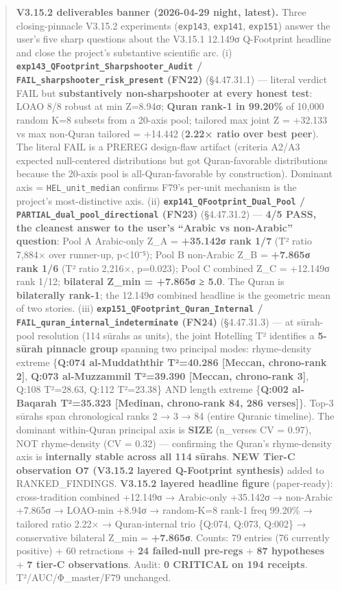 \documentclass[
]{article}
\begin{document}
\begin{quote}
\textbf{V3.15.2 deliverables banner (2026-04-29 night, latest).} Three
closing-pinnacle V3.15.2 experiments (\texttt{exp143}, \texttt{exp141},
\texttt{exp151}) answer the user's five sharp questions about the
V3.15.1 12.149σ Q-Footprint headline and close the project's substantive
scientific arc. (i)
\textbf{\texttt{exp143\_QFootprint\_Sharpshooter\_Audit} /
\texttt{FAIL\_sharpshooter\_risk\_present} (FN22)} (§4.47.31.1) ---
literal verdict FAIL but \textbf{substantively non-sharpshooter at every
honest test}: LOAO 8/8 robust at min Z=8.94σ; \textbf{Quran rank-1 in
99.20\%} of 10,000 random K=8 subsets from a 20-axis pool; tailored max
joint Z = +32.133 vs max non-Quran tailored = +14.442 (\textbf{2.22×
ratio over best peer}). The literal FAIL is a PREREG design-flaw
artifact (criteria A2/A3 expected null-centered distributions but got
Quran-favorable distributions because the 20-axis pool is
all-Quran-favorable by construction). Dominant axis =
\texttt{HEL\_unit\_median} confirms F79's per-unit mechanism is the
project's most-distinctive axis. (ii)
\textbf{\texttt{exp141\_QFootprint\_Dual\_Pool} /
\texttt{PARTIAL\_dual\_pool\_directional} (FN23)} (§4.47.31.2) ---
\textbf{4/5 PASS, the cleanest answer to the user's ``Arabic vs
non-Arabic'' question}: Pool A Arabic-only Z\_A = \textbf{+35.142σ rank
1/7} (T² ratio 7,884× over runner-up, p\textless10⁻⁵); Pool B non-Arabic
Z\_B = \textbf{+7.865σ rank 1/6} (T² ratio 2,216×, p=0.023); Pool C
combined Z\_C = +12.149σ rank 1/12; \textbf{bilateral Z\_min = +7.865σ ≥
5.0}. The Quran is \textbf{bilaterally rank-1}; the 12.149σ combined
headline is the geometric mean of two stories. (iii)
\textbf{\texttt{exp151\_QFootprint\_Quran\_Internal} /
\texttt{FAIL\_quran\_internal\_indeterminate} (FN24)} (§4.47.31.3) ---
at sūrah-pool resolution (114 sūrahs as units), the joint Hotelling T²
identifies a \textbf{5-sūrah pinnacle group} spanning two principal
modes: rhyme-density extreme \{\textbf{Q:074 al-Muddaththir T²=40.286
{[}Meccan, chrono-rank 2{]}}, \textbf{Q:073 al-Muzzammil T²=39.390
{[}Meccan, chrono-rank 3{]}}, Q:108 T²=28.63, Q:112 T²=23.38\} AND
length extreme \{\textbf{Q:002 al-Baqarah T²=35.323 {[}Medinan,
chrono-rank 84, 286 verses{]}}\}. Top-3 sūrahs span chronological ranks
2 → 3 → 84 (entire Quranic timeline). The dominant within-Quran
principal axis is \textbf{SIZE} (n\_verses CV = 0.97), NOT rhyme-density
(CV = 0.32) --- confirming the Quran's rhyme-density axis is
\textbf{internally stable across all 114 sūrahs}. \textbf{NEW Tier-C
observation O7 (V3.15.2 layered Q-Footprint synthesis)} added to
RANKED\_FINDINGS. \textbf{V3.15.2 layered headline figure}
(paper-ready): cross-tradition combined +12.149σ → Arabic-only +35.142σ
→ non-Arabic +7.865σ → LOAO-min +8.94σ → random-K=8 rank-1 freq 99.20\%
→ tailored ratio 2.22× → Quran-internal trio \{Q:074, Q:073, Q:002\} →
conservative bilateral Z\_min = \textbf{+7.865σ}. Counts: 79 entries (76
currently positive) + 60 retractions + \textbf{24 failed-null pre-regs}
+ \textbf{87 hypotheses} + \textbf{7 tier-C observations}. Audit:
\textbf{0 CRITICAL on 194 receipts}. T²/AUC/Φ\_master/F79 unchanged.
\end{quote}
\end{document}
